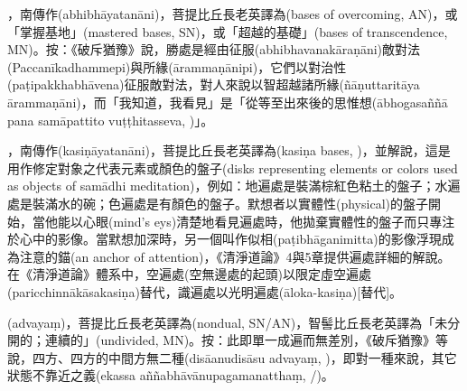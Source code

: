 \startitemgroup[noteitems]
\item{}，南傳作(abhibhāyatanāni)，菩提比丘長老英譯為(bases of overcoming, AN)，或「掌握基地」(mastered bases, SN)，或「超越的基礎」(bases of transcendence, MN)。按：《破斥猶豫》說，勝處是經由征服(abhibhavanakāraṇāni)敵對法(Paccanīkadhammepi)與所緣(ārammaṇānipi)，它們以對治性(paṭipakkhabhāvena)征服敵對法，對人來說以智超越諸所緣(ñāṇuttaritāya ārammaṇāni)，而「我知道，我看見」是「從等至出來後的思惟想(ābhogasaññā pana samāpattito vuṭṭhitasseva, )」。
\stopitemgroup

\startitemgroup[noteitems]
\item{}，南傳作(kasiṇāyatanāni)，菩提比丘長老英譯為(kasiṇa bases, )，並解說，這是用作修定對象之代表元素或顏色的盤子(disks representing elements or colors used as objects of samādhi meditation)，例如：地遍處是裝滿棕紅色粘土的盤子；水遍處是裝滿水的碗；色遍處是有顏色的盤子。默想者以實體性(physical)的盤子開始，當他能以心眼(mind's eys)清楚地看見遍處時，他拋棄實體性的盤子而只專注於心中的影像。當默想加深時，另一個叫作似相(paṭibhāganimitta)的影像浮現成為注意的錨(an anchor of attention)，《清淨道論》4與5章提供遍處詳細的解說。在《清淨道論》體系中，空遍處(空無邊處的起頭)以限定虛空遍處(paricchinnākāsakasiṇa)替代，識遍處以光明遍處(āloka-kasiṇa)[替代]。
\stopitemgroup

\startitemgroup[noteitems]
\item{}(advayaṃ)，菩提比丘長老英譯為(nondual, SN/AN)，智髻比丘長老英譯為「未分開的；連續的」(undivided, MN)。按：此即單一成遍而無差別，《破斥猶豫》等說，四方、四方的中間方無二種(disāanudisāsu advayaṃ, )，即對一種來說，其它狀態不靠近之義(ekassa aññabhāvānupagamanatthaṃ, /)。
\stopitemgroup

